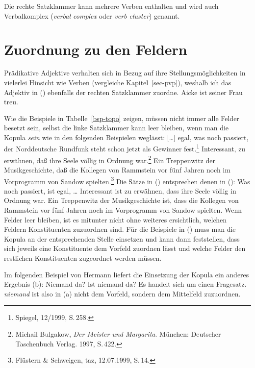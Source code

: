 Die rechte Satzklammer kann mehrere Verben enthalten und wird auch 
Verbalkomplex (\emph{verbal complex} oder \emph{verb cluster}) genannt.

\section{Zuordnung zu den Feldern}

Prädikative Adjektive verhalten sich in Bezug auf ihre Stellungsmöglichkeiten in vielerlei Hinsicht
wie Verben (vergleiche Kapitel~\ref{sec-pvp}), weshalb ich das Adjektiv in () ebenfalls der
rechten Satzklammer zuordne.
\ea
Aicke ist seiner Frau treu.
\z

\noindent
Wie die Beispiele in Tabelle~\ref{bsp-topo} zeigen, müssen nicht immer
alle Felder besetzt sein, selbst die linke Satzklammer kann leer bleiben,
wenn man die Kopula \emph{sein} wie in den folgenden Beispielen weglässt:
\eal
\ex
{}[\ldots]
egal,      was  noch  passiert, der Norddeutsche Rundfunk             steht  schon   jetzt als Gewinner fest.\footnote{
        Spiegel, 12/1999, S.\,258.
}
\ex Interessant, zu erwähnen, daß ihre Seele völlig    in Ordnung war.\footnote{
        Michail Bulgakow, \emph{Der Meister und Margarita}. München: Deutscher Taschenbuch Verlag. 1997, S.\,422.
      }
\ex
Ein Treppenwitz der    Musikgeschichte, daß die Kollegen   von Rammstein vor    fünf Jahren noch im      Vorprogramm   von Sandow spielten.\footnote{
         Flüstern \& Schweigen, taz, 12.07.1999, S.\,14. %
}
\zl
Die Sätze in () entsprechen denen in ():
\eal
\ex 
Was noch passiert, ist egal, \ldots
\ex
Interessant ist zu erwähnen, dass ihre Seele völlig in Ordnung war.
\ex 
Ein Treppenwitz der Musikgeschichte ist, dass die Kollegen von Rammstein vor fünf Jahren noch im Vorprogramm von Sandow spielten.
\zl
Wenn Felder leer bleiben, ist es mitunter nicht ohne weiteres
ersichtlich, welchen Feldern Konstituenten zuzuordnen sind.
Für die Beispiele in () muss man die Kopula an der entsprechenden Stelle einsetzen und kann
dann feststellen, dass sich jeweils eine Konstituente dem Vorfeld zuordnen lässt und welche Felder
den restlichen Konstituenten zugeordnet werden müssen.

Im folgenden Beispiel von Hermann \citet[]{Paul1919a} liefert die Einsetzung der Kopula
ein anderes Ergebnis (b):
\eal
\ex Niemand da?
\ex Ist niemand da?
\zl
Es handelt sich um einen Fragesatz. \emph{niemand} ist also in (a)
nicht dem Vorfeld, sondern dem Mittelfeld zuzuordnen.

